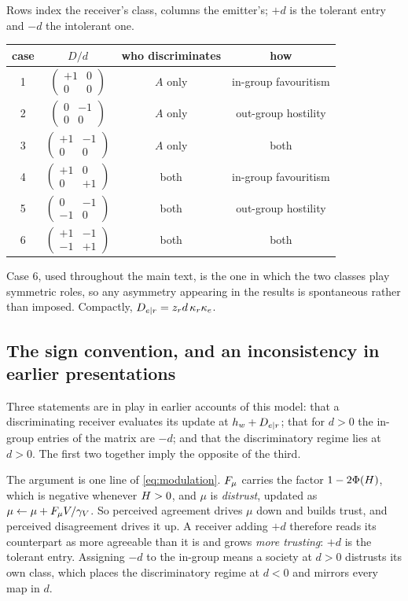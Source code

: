 Rows index the receiver's class, columns the emitter's; $+d$ is the tolerant
entry and $-d$ the intolerant one.

\newcommand{\dmat}[4]{\left(\begin{smallmatrix}#1&#2\\#3&#4\end{smallmatrix}\right)}
\begin{table}[h]
\centering\small
\begin{tabular}{cccc}
\toprule
case & $D/d$ & who discriminates & how \\
\midrule
1 & $\dmat{+1}{0}{0}{0}$    & $A$ only & in-group favouritism \\
2 & $\dmat{0}{-1}{0}{0}$    & $A$ only & out-group hostility \\
3 & $\dmat{+1}{-1}{0}{0}$   & $A$ only & both \\
4 & $\dmat{+1}{0}{0}{+1}$   & both     & in-group favouritism \\
5 & $\dmat{0}{-1}{-1}{0}$   & both     & out-group hostility \\
6 & $\dmat{+1}{-1}{-1}{+1}$ & both     & both \\
\bottomrule
\end{tabular}
\end{table}

Case 6, used throughout the main text, is the one in which the two classes play
symmetric roles, so any asymmetry appearing in the results is spontaneous rather
than imposed. Compactly, $D_{e|r}=z_r d\,\kappa_r\kappa_e$.

\subsection{The sign convention, and an inconsistency in earlier presentations}
\label{app:sign}

Three statements are in play in earlier accounts of this model: that a
discriminating receiver evaluates its update at $h_{w}+D_{e|r}$; that for $d>0$ the
in-group entries of the matrix are $-d$; and that the discriminatory regime lies
at $d>0$. The first two together imply the opposite of the third.

The argument is one line of \eqref{eq:modulation}. $F_{\mu}$ carries the factor
$1-2\Phi(H)$, which is negative whenever $H>0$, and $\mu$ is \emph{distrust},
updated as $\mu\leftarrow\mu+F_{\mu} V/\gamma_V$. So perceived agreement drives $\mu$
down and builds trust, and perceived disagreement drives it up. A receiver adding
$+d$ therefore reads its counterpart as more agreeable than it is and grows
\emph{more trusting}: $+d$ is the tolerant entry. Assigning $-d$ to the in-group
means a society at $d>0$ distrusts its own class, which places the discriminatory
regime at $d<0$ and mirrors every map in $d$.

